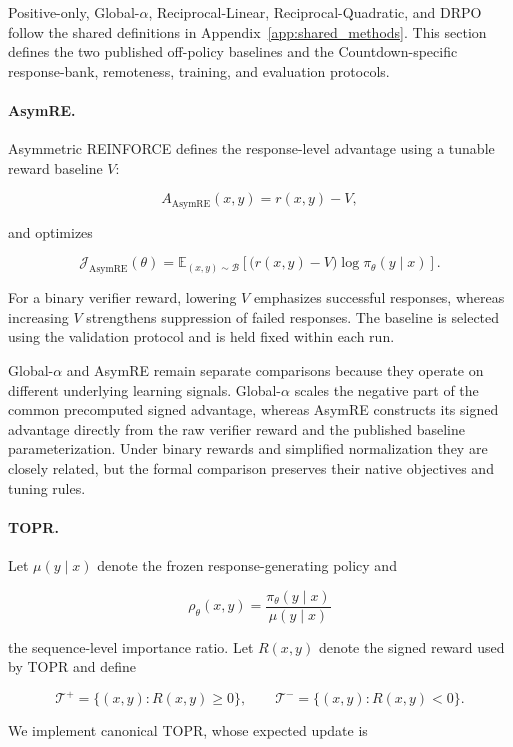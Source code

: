 Positive-only, Global-\(\alpha\), Reciprocal-Linear,
Reciprocal-Quadratic, and DRPO follow the shared definitions in
Appendix~\ref{app:shared_methods}. This section defines the two
published off-policy baselines and the Countdown-specific response-bank,
remoteness, training, and evaluation protocols.

\paragraph{AsymRE.}

Asymmetric REINFORCE defines the response-level advantage using a
tunable reward baseline \(V\):

\[
A_{\mathrm{AsymRE}}(x,y)
=
r(x,y)-V,
\]

and optimizes

\[
\mathcal{J}_{\mathrm{AsymRE}}(\theta)
=
\mathbb{E}_{(x,y)\sim\mathcal{B}}
\left[
\bigl(r(x,y)-V\bigr)
\log\pi_\theta(y\mid x)
\right].
\]

For a binary verifier reward, lowering \(V\) emphasizes successful
responses, whereas increasing \(V\) strengthens suppression of failed
responses. The baseline is selected using the validation protocol and
is held fixed within each run.

Global-\(\alpha\) and AsymRE remain separate comparisons because they
operate on different underlying learning signals. Global-\(\alpha\)
scales the negative part of the common precomputed signed advantage,
whereas AsymRE constructs its signed advantage directly from the raw
verifier reward and the published baseline parameterization. Under
binary rewards and simplified normalization they are closely related,
but the formal comparison preserves their native objectives and tuning
rules.

\paragraph{TOPR.}

Let \(\mu(y\mid x)\) denote the frozen response-generating policy and

\[
\rho_\theta(x,y)
=
\frac{\pi_\theta(y\mid x)}
     {\mu(y\mid x)}
\]

the sequence-level importance ratio. Let
\(R(x,y)\) denote the signed reward used by TOPR and define

\[
\mathcal{T}^{+}
=
\{(x,y):R(x,y)\geq 0\},
\qquad
\mathcal{T}^{-}
=
\{(x,y):R(x,y)<0\}.
\]

We implement canonical TOPR, whose expected update is

